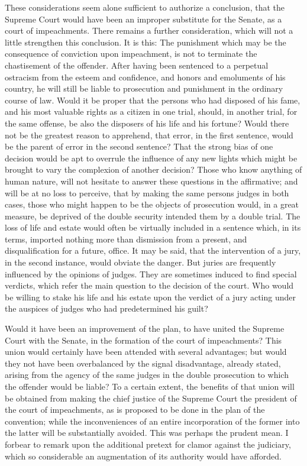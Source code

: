 These considerations seem alone sufficient to authorize a conclusion, that the Supreme Court would have been an improper substitute for the Senate, as a court of impeachments. 
There remains a further consideration, which will not a little strengthen this conclusion. 
It is this: The punishment which may be the consequence of conviction upon impeachment, is not to terminate the chastisement of the offender. 
After having been sentenced to a perpetual ostracism from the esteem and confidence, and honors and emoluments of his country, he will still be liable to prosecution and punishment in the ordinary course of law. 
Would it be proper that the persons who had disposed of his fame, and his most valuable rights as a citizen in one trial, should, in another trial, for the same offense, be also the disposers of his life and his fortune? 
Would there not be the greatest reason to apprehend, that error, in the first sentence, would be the parent of error in the second sentence? 
That the strong bias of one decision would be apt to overrule the influence of any new lights which might be brought to vary the complexion of another decision? 
Those who know anything of human nature, will not hesitate to answer these questions in the affirmative; and will be at no loss to perceive, that by making the same persons judges in both cases, those who might happen to be the objects of prosecution would, in a great measure, be deprived of the double security intended them by a double trial. 
The loss of life and estate would often be virtually included in a sentence which, in its terms, imported nothing more than dismission from a present, and disqualification for a future, office. 
It may be said, that the intervention of a jury, in the second instance, would obviate the danger. 
But juries are frequently influenced by the opinions of judges. 
They are sometimes induced to find special verdicts, which refer the main question to the decision of the court. 
Who would be willing to stake his life and his estate upon the verdict of a jury acting under the auspices of judges who had predetermined his guilt?

Would it have been an improvement of the plan, to have united the Supreme Court with the Senate, in the formation of the court of impeachments? 
This union would certainly have been attended with several advantages; but would they not have been overbalanced by the signal disadvantage, already stated, arising from the agency of the same judges in the double prosecution to which the offender would be liable? 
To a certain extent, the benefits of that union will be obtained from making the chief justice of the Supreme Court the president of the court of impeachments, as is proposed to be done in the plan of the convention; while the inconveniences of an entire incorporation of the former into the latter will be substantially avoided. 
This was perhaps the prudent mean. 
I forbear to remark upon the additional pretext for clamor against the judiciary, which so considerable an augmentation of its authority would have afforded.

